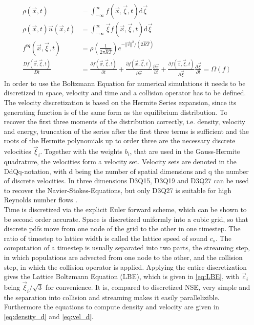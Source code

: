 \begin{align}
	\rho(\vec{x}, t) &= \int_{-\infty}^{\infty} f(\vec{x}, \vec{\xi}, t) \mathrm{d}\vec{\xi} \label{eq:rho} \\
	\rho(\vec{x}, t) \vec{u}(\vec{x}, t) &= \int_{-\infty}^{\infty} \vec{\xi} f(\vec{x}, \vec{\xi}, t) \mathrm{d}\vec{\xi} \label{eq:velocity}\\
	f^{eq} (\vec{x}, \vec{\xi}, t) &= \rho\left(\frac{1}{2 \pi \hat{R}\hat{T}}\right) e^{-\Vert \vec{v} \Vert^2/(2\hat{R}\hat{T}) } \label{eq:equilibrium} \\
	\frac{D f(\vec{x}, \vec{\xi}, t)}{Dt} &= \frac{ \partial f(\vec{x}, \vec{\xi}, t)}{\partial t} + \frac{ \partial f(\vec{x}, \vec{\xi}, t)}{\partial\vec{x}} \frac{\partial \vec{x}}{\partial t} + \frac{ \partial f(\vec{x}, \vec{\xi}, t)}{\partial \vec{\xi}} \frac{\partial \vec{\xi}}{\partial t} =  \Omega(f) \label{eq:boltzmann}
\end{align}
In order to use the Boltzmann Equation for numerical simulations it needs to be discretized in space, velocity and time and a collision operator has to be defined. \\
The velocity discretization is based on the Hermite Series expansion, since its generating function is of the same form as the equilibrium distribution. To recover the first three moments of the distribution correctly, i.e. density, velocity and energy, truncation of the series after the first three terms is sufficient and the roots of the Hermite polynomials up to order three are the necessary discrete velocities $\vec{\xi}_i$. Together with the weights $b_i$, that are used in the Gauss-Hermite quadrature, the velocities form a velocity set. Velocity sets are denoted in the DdQq-notation, with d being the number of spatial dimensions and q the number of discrete velocities. In three dimensions D3Q15, D3Q19 and D3Q27 can be used to recover the Navier-Stokes-Equations, but only D3Q27 is suitable for high Reynolds number flows \cite{kang_effect_2013}.\cite[p. 73-93]{kruger_lattice_2017} \\
Time is discretized via the explicit Euler forward scheme, which can be shown to be second order accurate. Space is discretized uniformly into a cubic grid, so that discrete pdfs move from one node of the grid to the other in one timestep. The ratio of timestep to lattice width is called the lattice speed of sound $c_s$. The computation of a timestep is usually separated into two parts, the streaming step, in which populations are advected from one node to the other, and the collision step, in which the collision operator is applied. Applying the entire discretization gives the Lattice Boltzmann Equation (LBE), which is given in \eqref{eq:LBE}, with $\vec{c}_i$ being $\vec{\xi}_i/\sqrt{3}$ for convenience. It is, compared to discretized NSE, very simple and the separation into collision and streaming makes it easily parallelizible. Furthermore the equations to compute density and velocity are given in \eqref{eq:density_d} and \eqref{eq:vel_d}. \cite[p. 94-98]{kruger_lattice_2017}\\
